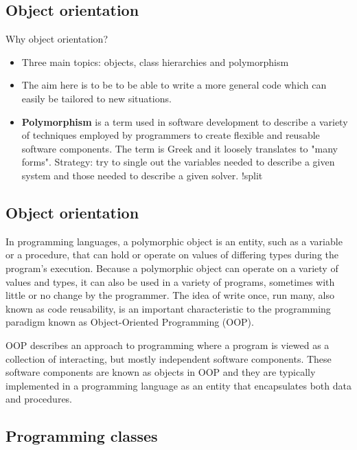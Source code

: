 \documentclass[%
oneside,                 %
final,                   %
10pt]{article}
\begin{document}
\subsection*{Object orientation}

Why object orientation?

\begin{itemize}
  \item Three main topics: objects, class hierarchies and polymorphism

  \item The aim here is to be to be able to write a more general code which can easily be tailored to new situations.

  \item {\bf Polymorphism} is a term used in software development to describe a variety of techniques employed by programmers to create flexible and reusable software components. The term is Greek and it loosely translates to "many forms". Strategy: try to single out the variables needed to describe a given system and those needed to describe a given solver. !split
\end{itemize}

\noindent
\subsection*{Object orientation}

In programming languages, a polymorphic object is an entity, such as a variable or a procedure, that can hold or operate on values of differing types during the program's execution. Because a polymorphic object can operate on a variety of values and types, it can also be used in a variety of programs, sometimes with little or no change by the programmer. The idea of write once, run many, also known as code reusability, is an important characteristic to the programming paradigm known as Object-Oriented Programming (OOP).

OOP describes an approach to programming where a program is viewed as a collection of interacting, but mostly independent software components. These software components are known as objects in OOP and they are typically implemented in a programming language as an entity that encapsulates both data and procedures.

\subsection*{Programming classes}
\end{document}
